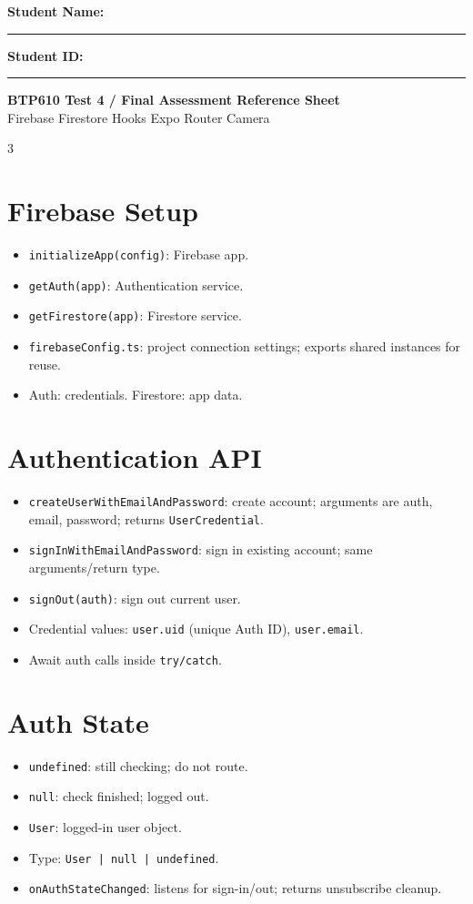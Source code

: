 \documentclass[10pt,a4paper]{article}
\begin{document}
\textbf{Student Name:} \rule[0pt]{2.35in}{0.4pt} \hfill
\textbf{Student ID:} \rule[0pt]{1.55in}{0.4pt}

\begin{center}
\textbf{BTP610 Test 4 / Final Assessment Reference Sheet}\\[-2pt]
Firebase \textbar{} Firestore \textbar{} Hooks \textbar{} Expo Router \textbar{} Camera
\end{center}
\vspace{-5pt}

\begin{multicols}{3}

\section*{Firebase Setup}
\begin{itemize}
  \item \texttt{initializeApp(config)}: Firebase app.
  \item \texttt{getAuth(app)}: Authentication service.
  \item \texttt{getFirestore(app)}: Firestore service.
  \item \texttt{firebaseConfig.ts}: project connection settings; exports shared instances for reuse.
  \item Auth: credentials. Firestore: app data.
\end{itemize}

\section*{Authentication API}
\begin{itemize}
  \item \texttt{createUserWithEmailAndPassword}: create account; arguments are auth, email, password; returns \texttt{UserCredential}.
  \item \texttt{signInWithEmailAndPassword}: sign in existing account; same arguments/return type.
  \item \texttt{signOut(auth)}: sign out current user.
  \item Credential values: \texttt{user.uid} (unique Auth ID), \texttt{user.email}.
  \item Await auth calls inside \texttt{try/catch}.
\end{itemize}

\section*{Auth State}
\begin{itemize}
  \item \texttt{undefined}: still checking; do not route.
  \item \texttt{null}: check finished; logged out.
  \item \texttt{User}: logged-in user object.
  \item Type: \texttt{User | null | undefined}.
  \item \texttt{onAuthStateChanged}: listens for sign-in/out; returns unsubscribe cleanup.
\end{itemize}


\end{multicols}
\end{document}
